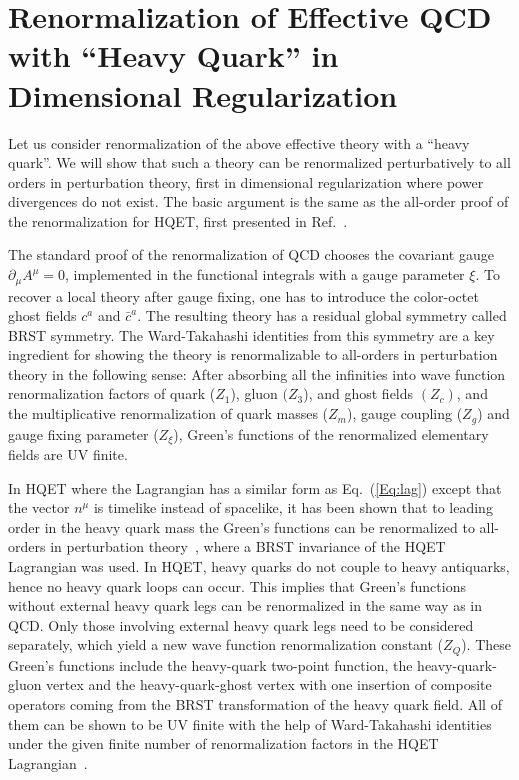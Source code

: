 \section{Renormalization of Effective QCD with ``Heavy Quark'' in Dimensional Regularization}

Let us consider renormalization of the above effective theory with a ``heavy quark''.
We will show that such a theory can be renormalized perturbatively to all orders in perturbation theory,
first in dimensional regularization where power divergences do not exist. The basic argument
is the same as the all-order proof of the renormalization for HQET, first
presented in Ref.~\cite{Bagan:1993zv}.

The standard proof of the renormalization of QCD chooses the covariant gauge $\partial_\mu A^\mu = 0$, implemented
in the functional integrals with a gauge parameter $\xi$. To recover a local theory after gauge
fixing, one has to introduce the color-octet ghost fields $c^a$ and $\bar c^a$. The resulting theory
has a residual global symmetry called BRST symmetry. The Ward-Takahashi identities
from this symmetry are a key ingredient for showing the theory is renormalizable to all-orders
in perturbation theory in the following sense: After absorbing all the infinities into
wave function renormalization factors of quark ($Z_1$), gluon $(Z_3$), and ghost fields $(Z_c)$, and the multiplicative
renormalization of quark masses ($Z_m$), gauge coupling ($Z_g$) and gauge fixing parameter ($Z_\xi$),
Green's functions of the renormalized elementary fields are UV finite.

In HQET where the Lagrangian has a similar form as Eq.~(\ref{Eq:lag}) except that the vector $n^\mu$ is timelike instead of spacelike, it has been shown that to leading order in the heavy quark mass the Green's functions can be renormalized to all-orders in perturbation theory~\cite{Bagan:1993zv}, where a BRST invariance of the HQET Lagrangian was used. In HQET, heavy quarks do not couple to heavy antiquarks, hence no heavy quark loops can occur. This implies that Green's functions without external heavy quark legs can be renormalized in the same way as in QCD. Only those involving external heavy quark legs need to be considered separately, which yield
a new wave function renormalization constant ($Z_Q$). These Green's functions include the heavy-quark two-point function, the heavy-quark-gluon vertex and the heavy-quark-ghost vertex with one insertion of composite operators coming from the BRST transformation of the heavy quark field. All of them can be shown to be UV finite with the help of Ward-Takahashi identities under the given finite number of renormalization factors in the HQET Lagrangian~\cite{Bagan:1993zv}.

